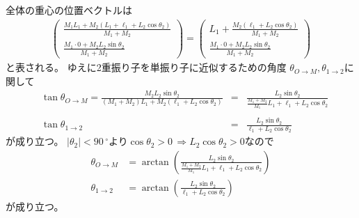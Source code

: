 \documentclass[a4paper,11pt]{jsarticle}
\begin{document}
全体の重心の位置ベクトルは
\begin{gather*}
  \left(
    \begin{gathered}
      \frac{M_1L_1 + M_2\left(L_1+\ell_1+L_2\cos\theta_2\right)}{M_1+M_2}
      \\
      \frac{M_1\cdot 0 + M_2L_2\sin\theta_2}{M_1+M_2}
    \end{gathered}
  \right)
  =
  \left(
    \begin{gathered}
      L_1 + \frac{M_2\left(\ell_1+L_2\cos\theta_2\right)}{M_1+M_2}
      \\
      \frac{M_1\cdot 0 + M_2L_2\sin\theta_2}{M_1+M_2}
    \end{gathered}
  \right)
\end{gather*}
と表される。
ゆえに2重振り子を単振り子に近似するための角度
$\theta_{O\rightarrow M}, \theta_{1\rightarrow 2}$に関して
\begin{align*}
  &\tan\theta_{O\rightarrow M}
  =\frac{
    M_2L_2\sin\theta_2
  }{
    (M_1+M_2)L_1 + M_2\left(\ell_1+L_2\cos\theta_2\right)
  }
  &=&\frac{L_2\sin\theta_2}{\frac{M_1+M_2}{M_1}L_1 + \ell_1 + L_2\cos\theta_2}
  \\
  \\
  &\tan\theta_{1\rightarrow 2}
  &=&\frac{
    L_2\sin\theta_2
  }{
    \ell_1+L_2\cos\theta_2
  }
\end{align*}
が成り立つ。
$|\theta_2|<90\,^\circ$より$\cos\theta_2>0\,\Rightarrow L_2\cos\theta_2>0$なので
\begin{align*}
  \theta_{O\rightarrow M}
  &= \arctan\left(\frac{L_2\sin\theta_2}{\frac{M_1+M_2}{M_1}L_1 + \ell_1 + L_2\cos\theta_2}\right)
  \\
  \theta_{1\rightarrow 2}
  &= \arctan
  \left(\frac{ L_2\sin\theta_2}{\ell_1+L_2\cos\theta_2} \right)
\end{align*}
が成り立つ。
\end{document}
